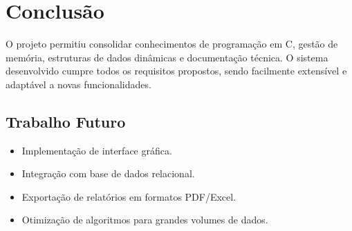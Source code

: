 \documentclass[a4paper,12pt]{report}
\begin{document}
\chapter{Conclusão}
O projeto permitiu consolidar conhecimentos de programação em C, gestão de memória, estruturas de dados dinâmicas e documentação técnica. O sistema desenvolvido cumpre todos os requisitos propostos, sendo facilmente extensível e adaptável a novas funcionalidades.

\section{Trabalho Futuro}
\begin{itemize}
    \item Implementação de interface gráfica.
    \item Integração com base de dados relacional.
    \item Exportação de relatórios em formatos PDF/Excel.
    \item Otimização de algoritmos para grandes volumes de dados.
\end{itemize}
\end{document}
